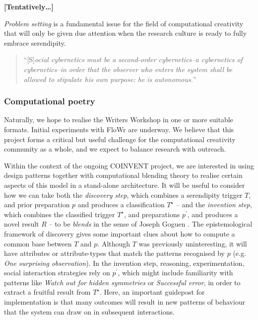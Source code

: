 \textbf{[Tentatively\ldots]}

\emph{Problem setting} is a fundamental issue for the field of
computational creativity that will only be given due attention when
the research culture is ready to fully embrace serendipity.

\begin{quote}
``[S]\emph{ocial cybernetics must be a second-order cybernetics--a
    cybernetics of cybernetics--in order that the observer who enters
    the system shall be allowed to stipulate his own purpose: he is
    autonomous.}'' \cite[p. 286]{von2003essays}
\end{quote}

\subsubsection{Computational poetry}

Naturally, we hope to realise the Writers Workshop in one or more
suitable formats.  Initial experiments with {\sf FloWr} are underway.
We believe that this project forms a critical but useful challenge for
the computational creativity community as a whole, and we expect to
balance research with outreach.

Within the context of the ongoing COINVENT project, we are interested
in using design patterns together with computational blending theory
to realise certain aspects of this model in a stand-alone
architecture.
%
It will be useful to consider how we can take both the \emph{discovery
  step}, which combines a serendipity trigger $T$, and prior
preparation $p$ and produces a classification $T^{\star}$ -- and the
\emph{invention step}, which combines the classified trigger
$T^{\star}$, and preparations $p^{\prime}$, and produces a novel
result $R$ -- to be \emph{blends} in the sense of Joseph Goguen
\cite{goguen1999introduction}.  The epistemological framework of
discovery gives some important clues about how to compute a common
base between $T$ and $p$.  Although $T$ was previously uninteresting,
it will have attributes or attribute-types that match the patterns
recognised by $p$ (e.g. \emph{One surprising observation}).  In the
invention step, reasoning, experimentation, social interaction
strategies rely on $p^{\prime}$, which might include familiarity with
patterns like \emph{Watch out for hidden symmetries} or
\emph{Successful error}, in order to extract a fruitful result from
$T^{\star}$.  Here, an important guidepost for implementation is that
many outcomes will result in new patterns of behaviour that the system
can draw on in subsequent interactions.


